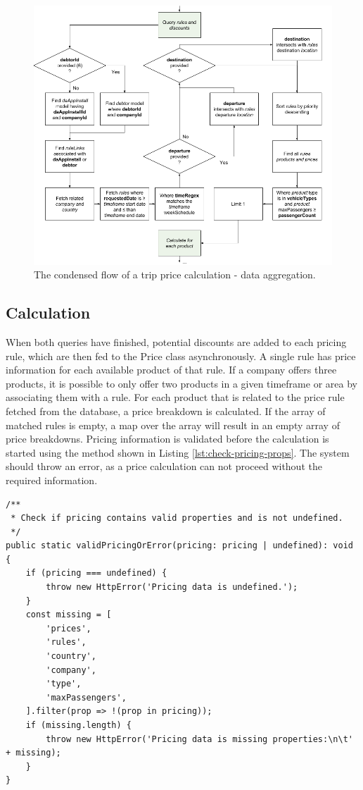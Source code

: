 \begin{figure}[H]
	\centering
	\includegraphics[width=.8\textwidth]{DataAggregation}
	\caption[Data Aggregation]{The condensed flow of a trip price calculation - data aggregation.}
	\label{fig:Data Aggregation}
\end{figure}

\subsection{Calculation}
When both queries have finished, potential discounts are added to each pricing rule, which are then fed to the Price class asynchronously. A single rule has price information for each available product of that rule. If a company offers three products, it is possible to only offer two products in a given timeframe or area by associating them with a rule. For each product that is related to the price rule fetched from the database, a price breakdown is calculated. If the array of matched rules is empty, a map over the array will result in an empty array of price breakdowns. Pricing information is validated before the calculation is started using the method shown in Listing \ref{lst:check-pricing-props}. The system should throw an error, as a price calculation can not proceed without the required information.

\begin{center}
\noindent\begin{minipage}{.85\textwidth}
\begin{lstlisting}[caption={Find missing properties.}, label={lst:check-pricing-props}]
/**
 * Check if pricing contains valid properties and is not undefined.
 */
public static validPricingOrError(pricing: pricing | undefined): void {
	if (pricing === undefined) {
		throw new HttpError('Pricing data is undefined.');
	}
	const missing = [
		'prices',
		'rules',
		'country',
		'company',
		'type',
		'maxPassengers',
	].filter(prop => !(prop in pricing));
	if (missing.length) {
		throw new HttpError('Pricing data is missing properties:\n\t' + missing);
	}
}
\end{lstlisting}
\end{minipage}
\end{center}

